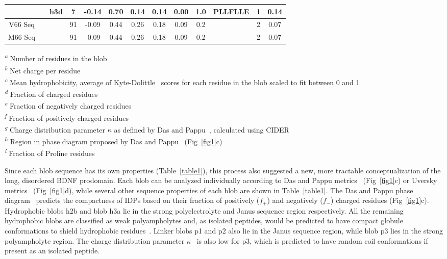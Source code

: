 \documentclass[10pt,letterpaper]{article}
\begin{document}
\begin{table}[!ht]
\begin{adjustwidth}{-2.25in}{0in}
\begin{tabular}{|c|c|c|c|c|c|c|c|c|c|c|c|c|}
\hhline{~~-----------}
&&h3d & 7 & -0.14 & 0.70 & 0.14 & 0.14 & 0.00 & 1.0 & PLLFLLE & 1& 0.14\\
\hline
\hline
V66 Seq&& & 91 & -0.09 & 0.44 & 0.26 & 0.18 & 0.09 & 0.2 & & 2 &0.07 \\
\hline
M66 Seq&& & 91 & -0.09 & 0.44 & 0.26 & 0.18 & 0.09 & 0.2 & & 2 &0.07 \\
\hline
\end{tabular}
\begin{flushleft}
\textsuperscript{\emph{a}} Number of residues in the blob\\
\textsuperscript{\emph{b}} Net charge per residue\\
\textsuperscript{\emph{c}} Mean hydrophobicity, average of Kyte-Dolittle~\cite{Kyte1982a} scores for each residue in the blob scaled to fit between 0 and 1 \\
\textsuperscript{\emph{d}} Fraction of charged residues\\
\textsuperscript{\emph{e}} Fraction of negatively charged residues\\
\textsuperscript{\emph{f}} Fraction of positively charged residues\\ 
\textsuperscript{\emph{g}} Charge distribution parameter $\kappa$ as defined by Das and Pappu~\cite{Das2013}, calculated using CIDER~\cite{Holehouse2017} \\
\textsuperscript{\emph{h}} Region in phase diagram proposed by Das and Pappu~\cite{Das2013} (Fig~\ref{fig1}c)\\
\textsuperscript{\emph{i}} Fraction of Proline residues\\
\end{flushleft}
\end{adjustwidth}
\end{table}

Since each blob sequence has its own properties (Table~\ref{table1}), this process also suggested a new, more tractable conceptualization of the long, disordered BDNF prodomain. Each blob can be analyzed individually according to Das and Pappu metrics~\cite{Das2013} (Fig~\ref{fig1}c) or Uversky metrics~\cite{Uversky2000a} (Fig~\ref{fig1}d), while several other sequence properties of each blob are shown in Table~\ref{table1}.
The Das and Pappu phase diagram~\cite{Das2013} predicts the compactness of IDPs based on their fraction of positively ($f_{+}$) and negatively ($f_{-}$) charged residues (Fig~\ref{fig1}c). Hydrophobic blobs h2b and blob h3a lie in the strong polyelectrolyte and Janus sequence region respectively. All the remaining hydrophobic blobs are classified as weak polyampholytes and, as isolated peptides, would be predicted to have compact globule conformations to shield hydrophobic residues~\cite{Das2013}. Linker blobs p1 and p2 also lie in the Janus sequence region, while blob p3 lies in the strong polyampholyte region. The charge distribution parameter $\kappa$~\cite{Das2013} is also low for p3, which is predicted to have random coil conformations if present as an isolated peptide.
\end{document}
